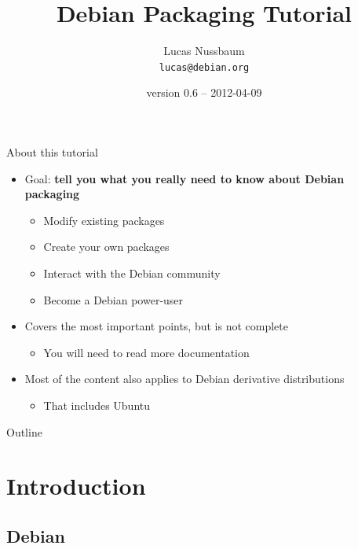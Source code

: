 \documentclass[10pt,final]{beamer}
\title{Debian Packaging Tutorial}
\author[]{Lucas Nussbaum\\{\small\texttt{lucas@debian.org}}}
\date{\footnotesize version 0.6 -- 2012-04-09} %
\begin{document}
\frame{\titlepage}

\begin{frame}{About this tutorial}
  \begin{itemize}
  \item Goal: \textbf{tell you what you really need to know about Debian packaging}
    \begin{itemize}
      \hbr
    \item Modify existing packages
      \hbr
    \item Create your own packages
	    \hbr
    \item Interact with the Debian community
      \hbr
    \item Become a Debian power-user
    \end{itemize}
    \br
  \item Covers the most important points, but is not complete
    \begin{itemize}
    \item You will need to read more documentation
    \end{itemize}
    \br
  \item Most of the content also applies to Debian derivative distributions
    \begin{itemize}
      \hbr
    \item That includes Ubuntu
    \end{itemize}
  \end{itemize}
\end{frame}

\begin{frame}{Outline}
  \tableofcontents[hideallsubsections]
\end{frame}

\section{Introduction}

\subsection{Debian}
\end{document}
